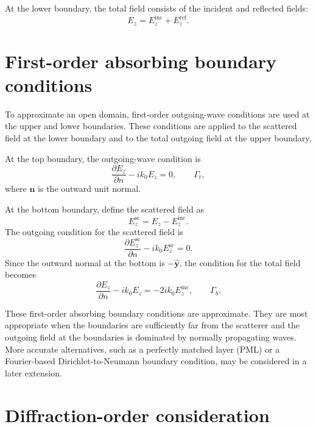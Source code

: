 \documentclass{article}
\begin{document}
At the lower boundary, the total field consists of the incident and
reflected fields:
\begin{equation}
    E_z=E_z^{\mathrm{inc}}+E_z^{\mathrm{ref}}.
\end{equation}

\section{First-order absorbing boundary conditions}

To approximate an open domain, first-order outgoing-wave conditions
are used at the upper and lower boundaries. These conditions are
applied to the scattered field at the lower boundary and to the total
outgoing field at the upper boundary.

At the top boundary, the outgoing-wave condition is
\begin{equation}
    \frac{\partial E_z}{\partial n}-ik_0E_z=0,
    \qquad \Gamma_t,
    \label{eq:top_abc}
\end{equation}
where $\mathbf{n}$ is the outward unit normal.

At the bottom boundary, define the scattered field as
\begin{equation}
    E_z^{\mathrm{sc}}=E_z-E_z^{\mathrm{inc}}.
\end{equation}
The outgoing condition for the scattered field is
\begin{equation}
    \frac{\partial E_z^{\mathrm{sc}}}{\partial n}
    -ik_0E_z^{\mathrm{sc}}=0.
\end{equation}
Since the outward normal at the bottom is $-\hat{\mathbf{y}}$, the
condition for the total field becomes
\begin{equation}
    \frac{\partial E_z}{\partial n}-ik_0E_z
    =-2ik_0E_z^{\mathrm{inc}},
    \qquad \Gamma_b.
    \label{eq:bottom_abc}
\end{equation}

These first-order absorbing boundary conditions are approximate. They
are most appropriate when the boundaries are sufficiently far from the
scatterer and the outgoing field at the boundaries is dominated by
normally propagating waves. More accurate alternatives, such as a
perfectly matched layer (PML) or a Fourier-based
Dirichlet-to-Neumann boundary condition, may be considered in a later
extension.

\section{Diffraction-order consideration}
\end{document}
